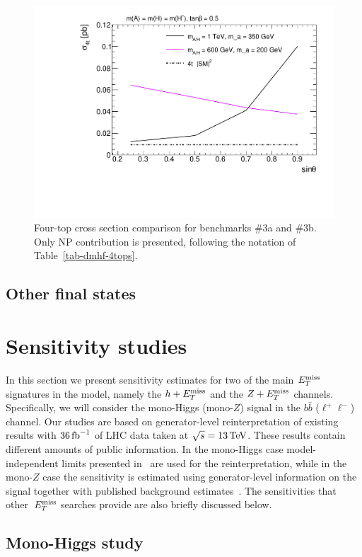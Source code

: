 \begin{figure}
\centering
\includegraphics[width=.8\textwidth]{texinputs/04_grid/figures/DMHF/4tops/WHP_final_stscan.pdf}
\caption{Four-top cross section comparison for benchmarks \#3a and \#3b. Only NP contribution is presented, following the notation of Table~\ref{tab-dmhf-4tops}.}
\label{DMHF-4top-scan3}
\end{figure}

\subsection{Other final states}
\label{sec:others}

\section{Sensitivity studies}
\label{sec:sensitivitystudies}

In this section we present sensitivity estimates for two of the main $E_T^\mathrm{miss}$ signatures in the \hdma model, namely the $h +E_T^\mathrm{miss}$  and the $Z+E_T^\mathrm{miss}$ channels. Specifically, we will consider the mono-Higgs (mono-$Z$) signal in the $b \bar b$ ($\ell^+ \ell^-$) channel. Our studies are based on generator-level reinterpretation of existing results with  $36 \, {\rm fb}^{-1}$ of LHC data taken at $\sqrt{s} = 13 \, {\rm TeV}$. These results contain different amounts of public information. In the mono-Higgs case model-independent limits presented in~\cite{Aaboud:2017yqz} are used for the reinterpretation, while in the mono-$Z$ case  the sensitivity is estimated using generator-level information on the signal together with published background estimates~\cite{Aaboud:2017bja}. The sensitivities that other~$E_T^\mathrm{miss}$ searches provide are also briefly discussed below.  

\subsection{Mono-Higgs study}
\label{sec:sensi_monohbb}

